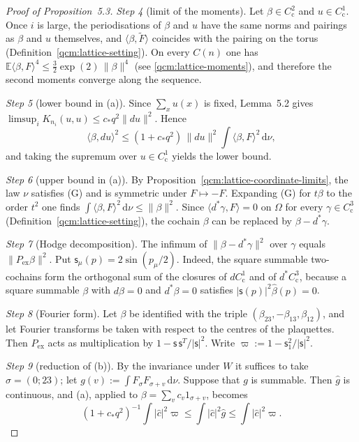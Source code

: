 \documentclass[11pt,letterpaper,reqno]{amsart}
\theoremstyle{definition}
\begin{document}
\begin{proof}[Proof of Proposition~5.3]
\emph{Step 4} (limit of the moments).
Let $\beta\in C^2_{\mathrm c}$ and $u\in C^1_{\mathrm c}$.
Once $i$ is large, the periodisations of $\beta$ and $u$ have the same norms and pairings as $\beta$ and $u$ themselves, and $\langle\beta,\widetilde F\rangle$ coincides with the pairing on the torus (Definition~\ref{qcm:lattice-setting}).
On every $C(n)$ one has $\mathbb E\langle\beta,F\rangle^4\le\frac32\exp(2)\,\|\beta\|^4$ (see \eqref{qcm:lattice-moments}), and therefore the second moments converge along the sequence.

\emph{Step 5} (lower bound in (a)).
Since $\sum_xu(x)$ is fixed, Lemma~5.2 gives $\limsup_iK_{n_i}(u,u)\le c_*q^2\|du\|^2$.
Hence
\begin{equation*}
\langle\beta,du\rangle^2\le(1+c_*q^2)\,\|du\|^2\int\langle\beta,F\rangle^2\,\mathrm d\nu,
\end{equation*}
and taking the supremum over $u\in C^1_{\mathrm c}$ yields the lower bound.

\emph{Step 6} (upper bound in (a)).
By Proposition~\ref{qcm:lattice-coordinate-limits}, the law $\nu$ satisfies (G) and is symmetric under $F\mapsto-F$.
Expanding (G) for $t\beta$ to the order $t^2$ one finds $\int\langle\beta,F\rangle^2\,\mathrm d\nu\le\|\beta\|^2$.
Since $\langle d^*\gamma,F\rangle=0$ on $\Omega$ for every $\gamma\in C^3_{\mathrm c}$ (Definition~\ref{qcm:lattice-setting}), the cochain $\beta$ can be replaced by $\beta-d^*\gamma$.

\emph{Step 7} (Hodge decomposition).
The infimum of $\|\beta-d^*\gamma\|^2$ over $\gamma$ equals $\|P_{\mathrm{ex}}\beta\|^2$.
Put $\mathsf s_\mu(p)=2\sin(p_\mu/2)$.
Indeed, the square summable two-cochains form the orthogonal sum of the closures of $dC^1_{\mathrm c}$ and of $d^*C^3_{\mathrm c}$, because a square summable $\beta$ with $d\beta=0$ and $d^*\beta=0$ satisfies $|\mathsf s(p)|^2\hat\beta(p)=0$.

\emph{Step 8} (Fourier form).
Let $\beta$ be identified with the triple $(\beta_{23},-\beta_{13},\beta_{12})$, and let Fourier transforms be taken with respect to the centres of the plaquettes.
Then $P_{\mathrm{ex}}$ acts as multiplication by $1-\mathsf s\,\mathsf s^{T}/|\mathsf s|^2$.
Write $\varpi:=1-\mathsf s_1^2/|\mathsf s|^2$.

\emph{Step 9} (reduction of (b)).
By the invariance under $W$ it suffices to take $\sigma=(0;23)$; let $g(v):=\int F_\sigma F_{\sigma+v}\,\mathrm d\nu$.
Suppose that $g$ is summable.
Then $\hat g$ is continuous, and (a), applied to $\beta=\sum_vc_v1_{\sigma+v}$, becomes
\begin{equation*}
(1+c_*q^2)^{-1}\int|\hat c|^2\varpi\le\int|\hat c|^2\hat g\le\int|\hat c|^2\varpi.
\end{equation*}


\end{proof}
\end{document}
